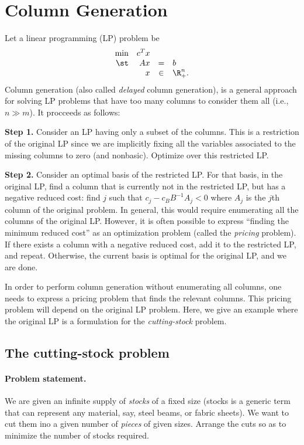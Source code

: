 \section{Column Generation}
Let a linear programming (LP) problem be
\[
\begin{array}{rrcl}
\min & c^T x \\
\st  & A x &   =  & b \\
    &    x & \in  & \R^n_+.
\end{array}
\]
Column generation (also called \emph{delayed} column generation), is a
general approach for solving LP problems that have too many columns
to consider them all (i.e., $n \gg m$).
It procceeds as follows:

\textbf{Step 1.}
Consider an LP having only a subset of the columns.
This is a restriction of the original LP since we are implicitly
fixing all the variables associated to the missing columns to zero
(and nonbasic). Optimize over this restricted LP.

\textbf{Step 2.}
Consider an optimal basis of the restricted LP.
For that basis, in the original LP, find a column that is currently not in
the restricted LP, but has a negative reduced cost:
find $j$ such that $c_j - c_B B^{-1} A_j < 0$ where $A_j$ is the $j$th column
of the original problem.
In general, this would require enumerating all the columns of the original
LP. However, it is often possible to express ``finding the minimum reduced
cost'' as an optimization problem (called the \emph{pricing} problem).
If there exists a column with a negative reduced cost, add it to the
restricted LP, and repeat.
Otherwise, the current basis is optimal for the original LP, and we are done.

In order to perform column generation without enumerating all columns,
one needs to express a pricing problem that finds the relevant columns.
This pricing problem will depend on the original LP problem.
Here, we give an example where the original LP is a formulation for
the \emph{cutting-stock} problem.

\subsection{The cutting-stock problem}

\paragraph{Problem statement. }
We are given an infinite supply of \emph{stocks} of a fixed size
(stocks is a generic term that can represent any material,
say, steel beams, or fabric sheets). We want to cut them ino a given
number of \emph{pieces} of given sizes.
Arrange the cuts so as to minimize the number of stocks required.

